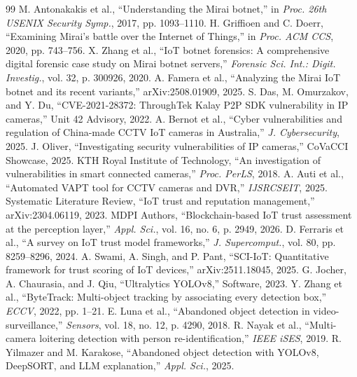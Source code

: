 \documentclass[12pt,a4paper]{article}
\begin{document}
\begin{thebibliography}{99}
 M. Antonakakis et al., ``Understanding the Mirai botnet,'' in \emph{Proc. 26th USENIX Security Symp.}, 2017, pp. 1093--1110.
 H. Griffioen and C. Doerr, ``Examining Mirai's battle over the Internet of Things,'' in \emph{Proc. ACM CCS}, 2020, pp. 743--756.
 X. Zhang et al., ``IoT botnet forensics: A comprehensive digital forensic case study on Mirai botnet servers,'' \emph{Forensic Sci. Int.: Digit. Investig.}, vol. 32, p. 300926, 2020.
 A. Famera et al., ``Analyzing the Mirai IoT botnet and its recent variants,'' arXiv:2508.01909, 2025.
 S. Das, M. Omurzakov, and Y. Du, ``CVE-2021-28372: ThroughTek Kalay P2P SDK vulnerability in IP cameras,'' Unit 42 Advisory, 2022.
 A. Bernot et al., ``Cyber vulnerabilities and regulation of China-made CCTV IoT cameras in Australia,'' \emph{J. Cybersecurity}, 2025.
 J. Oliver, ``Investigating security vulnerabilities of IP cameras,'' CoVaCCI Showcase, 2025.
 KTH Royal Institute of Technology, ``An investigation of vulnerabilities in smart connected cameras,'' \emph{Proc. PerLS}, 2018.
 A. Auti et al., ``Automated VAPT tool for CCTV cameras and DVR,'' \emph{IJSRCSEIT}, 2025.
 Systematic Literature Review, ``IoT trust and reputation management,'' arXiv:2304.06119, 2023.
 MDPI Authors, ``Blockchain-based IoT trust assessment at the perception layer,'' \emph{Appl. Sci.}, vol. 16, no. 6, p. 2949, 2026.
 D. Ferraris et al., ``A survey on IoT trust model frameworks,'' \emph{J. Supercomput.}, vol. 80, pp. 8259--8296, 2024.
 A. Swami, A. Singh, and P. Pant, ``SCI-IoT: Quantitative framework for trust scoring of IoT devices,'' arXiv:2511.18045, 2025.
 G. Jocher, A. Chaurasia, and J. Qiu, ``Ultralytics YOLOv8,'' Software, 2023.
 Y. Zhang et al., ``ByteTrack: Multi-object tracking by associating every detection box,'' \emph{ECCV}, 2022, pp. 1--21.
 E. Luna et al., ``Abandoned object detection in video-surveillance,'' \emph{Sensors}, vol. 18, no. 12, p. 4290, 2018.
 R. Nayak et al., ``Multi-camera loitering detection with person re-identification,'' \emph{IEEE iSES}, 2019.
 R. Yilmazer and M. Karakose, ``Abandoned object detection with YOLOv8, DeepSORT, and LLM explanation,'' \emph{Appl. Sci.}, 2025.

\end{thebibliography}
\end{document}
